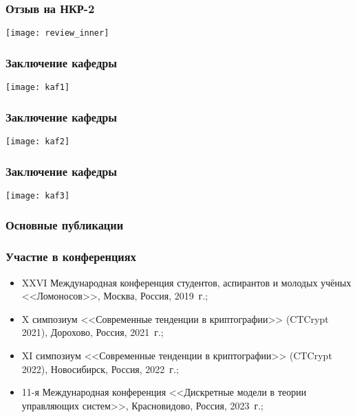 \begin{frame}
    \frametitle{Отзыв на НКР-2}
    \centering
    \texttt{[image: review\_inner]}
\end{frame}

\begin{frame}
    \frametitle{Заключение кафедры}
    \centering
    \texttt{[image: kaf1]}
\end{frame}

\begin{frame}
    \frametitle{Заключение кафедры}
    \centering
    \texttt{[image: kaf2]}
\end{frame}

\begin{frame}
    \frametitle{Заключение кафедры}
    \centering
    \texttt{[image: kaf3]}
\end{frame}

\begin{frame} %
    \frametitle{Основные публикации}
    \nocite{intsys20}
    \nocite{pdm20}
    \nocite{dm21}
    \nocite{fpe22}
    \nocite{galatenko23}
    \nocite{galatenko2023proper}
    \nocite{fpm23}
    \nocite{sibecrypt23}
    \nocite{tsar24}
\end{frame}

\begin{frame}
\frametitle{Участие в конференциях}
    \begin{itemize}
        \item XXVI Международная конференция студентов, аспирантов и молодых учёных <<Ломоносов>>, Москва, Россия, 2019~г.;
    
        \item X симпозиум <<Современные тенденции в криптографии>> (CTCrypt 2021), Дорохово, Россия, 2021~г.;
    
        \item XI симпозиум <<Современные тенденции в криптографии>> (CTCrypt 2022), Новосибирск, Россия, 2022~г.;
        
        \item 11-я Международная конференция <<Дискретные модели в теории управляющих систем>>, Красновидово, Россия, 2023~г.;
    \end{itemize}
\end{frame}

